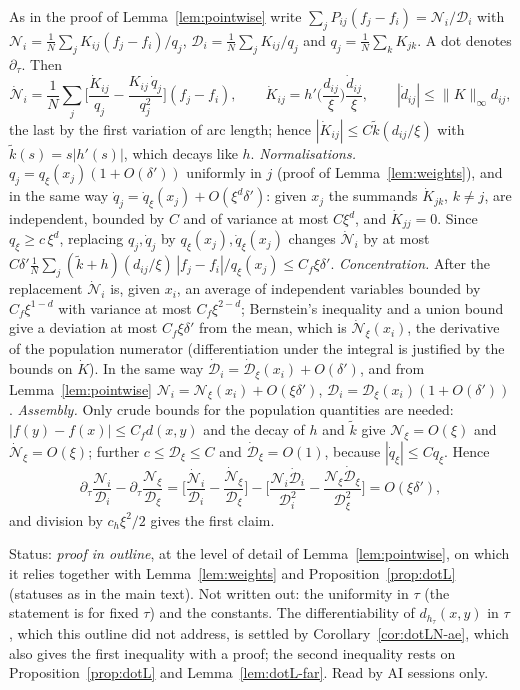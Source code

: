 \documentclass[11pt,a4paper]{article}
\makeatletter
\theoremstyle{stmt}
\theoremstyle{defn}
\theoremstyle{rmk}
\renewenvironment{proof}[1][\proofname]{\par\pushQED{\qed}\normalfont\topsep6\p@\@plus6\p@\relax
  \trivlist\item[\hskip\labelsep{\sffamily\itshape\small #1.}]\ignorespaces}{\popQED\endtrivlist\@endpefalse}
\numberwithin{equation}{section}
\newcommand{\status}[1]{\par\noindent\textsf{\small Status: #1}\par}
\makeatother
\begin{document}
{\begin{proof}[Proof in outline]
As in the proof of Lemma~\ref{lem:pointwise} write $\sum_jP_{ij}(f_j-f_i)=\mathcal N_i/\mathcal D_i$ with $\mathcal N_i=\frac1N\sum_jK_{ij}(f_j-f_i)/q_j$, $\mathcal D_i=\frac1N\sum_jK_{ij}/q_j$ and $q_j=\frac1N\sum_kK_{jk}$. A dot denotes $\partial_\tau$. Then
\[
\dot{\mathcal N}_i=\frac1N\sum_j\Big[\frac{\dot K_{ij}}{q_j}-\frac{K_{ij}\,\dot q_j}{q_j^2}\Big](f_j-f_i),\qquad
\dot K_{ij}=h'\!\Big(\frac{d_{ij}}\xi\Big)\frac{\dot d_{ij}}\xi,\qquad|\dot d_{ij}|\le\|K\|_\infty d_{ij},
\]
the last by the first variation of arc length; hence $|\dot K_{ij}|\le C\tilde k(d_{ij}/\xi)$ with $\tilde k(s)=s|h'(s)|$, which decays like $h$. \emph{Normalisations.} $q_j=q_\xi(x_j)(1+O(\delta'))$ uniformly in $j$ (proof of Lemma~\ref{lem:weights}), and in the same way $\dot q_j=\dot q_\xi(x_j)+O(\xi^d\delta')$: given $x_j$ the summands $\dot K_{jk}$, $k\ne j$, are independent, bounded by $C$ and of variance at most $C\xi^d$, and $\dot K_{jj}=0$. Since $q_\xi\ge c\,\xi^d$, replacing $q_j,\dot q_j$ by $q_\xi(x_j),\dot q_\xi(x_j)$ changes $\dot{\mathcal N}_i$ by at most $C\delta'\frac1N\sum_j(\tilde k+h)(d_{ij}/\xi)\,|f_j-f_i|/q_\xi(x_j)\le C_f\xi\delta'$. \emph{Concentration.} After the replacement $\dot{\mathcal N}_i$ is, given $x_i$, an average of independent variables bounded by $C_f\xi^{1-d}$ with variance at most $C_f\xi^{2-d}$; Bernstein's inequality and a union bound give a deviation at most $C_f\xi\delta'$ from the mean, which is $\dot{\mathcal N}_\xi(x_i)$, the derivative of the population numerator (differentiation under the integral is justified by the bounds on $\dot K$). In the same way $\dot{\mathcal D}_i=\dot{\mathcal D}_\xi(x_i)+O(\delta')$, and from Lemma~\ref{lem:pointwise} $\mathcal N_i=\mathcal N_\xi(x_i)+O(\xi\delta')$, $\mathcal D_i=\mathcal D_\xi(x_i)(1+O(\delta'))$. \emph{Assembly.} Only crude bounds for the population quantities are needed: $|f(y)-f(x)|\le C_fd(x,y)$ and the decay of $h$ and $\tilde k$ give $\mathcal N_\xi=O(\xi)$ and $\dot{\mathcal N}_\xi=O(\xi)$; further $c\le\mathcal D_\xi\le C$ and $\dot{\mathcal D}_\xi=O(1)$, because $|\dot q_\xi|\le Cq_\xi$. Hence
\[
\partial_\tau\frac{\mathcal N_i}{\mathcal D_i}-\partial_\tau\frac{\mathcal N_\xi}{\mathcal D_\xi}
=\Big[\frac{\dot{\mathcal N}_i}{\mathcal D_i}-\frac{\dot{\mathcal N}_\xi}{\mathcal D_\xi}\Big]-\Big[\frac{\mathcal N_i\dot{\mathcal D}_i}{\mathcal D_i^2}-\frac{\mathcal N_\xi\dot{\mathcal D}_\xi}{\mathcal D_\xi^2}\Big]=O(\xi\delta'),
\]
and division by $c_h\xi^2/2$ gives the first claim.
\end{proof}
\status{\emph{proof in outline}, at the level of detail of Lemma~\ref{lem:pointwise}, on which it relies together with Lemma~\ref{lem:weights} and Proposition~\ref{prop:dotL} (statuses as in the main text). Not written out: the uniformity in $\tau$ (the statement is for fixed $\tau$) and the constants. The differentiability of $d_{h_\tau}(x,y)$ in $\tau$, which this outline did not address, is settled by Corollary~\ref{cor:dotLN-ae}, which also gives the first inequality with a proof; the second inequality rests on Proposition~\ref{prop:dotL} and Lemma~\ref{lem:dotL-far}. Read by AI sessions only.}

}
\end{document}
